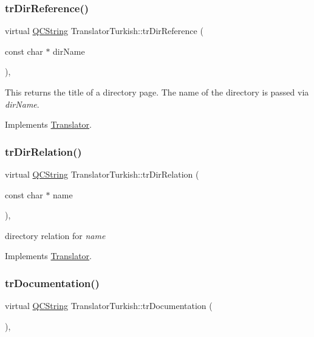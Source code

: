 \subsubsection{\texorpdfstring{trDirReference()}{trDirReference()}}
{\footnotesize\ttfamily virtual \mbox{\hyperlink{class_q_c_string}{Q\+C\+String}} Translator\+Turkish\+::tr\+Dir\+Reference (\begin{DoxyParamCaption}\item[{const char $\ast$}]{dir\+Name }\end{DoxyParamCaption})\hspace{0.3cm}{\ttfamily [inline]}, {\ttfamily [virtual]}}

This returns the title of a directory page. The name of the directory is passed via {\itshape dir\+Name}. 

Implements \mbox{\hyperlink{class_translator}{Translator}}.

\mbox{\label{class_translator_turkish_aaf0dc4f3528c646b7cbe8e043898049a}} 
\subsubsection{\texorpdfstring{trDirRelation()}{trDirRelation()}}
{\footnotesize\ttfamily virtual \mbox{\hyperlink{class_q_c_string}{Q\+C\+String}} Translator\+Turkish\+::tr\+Dir\+Relation (\begin{DoxyParamCaption}\item[{const char $\ast$}]{name }\end{DoxyParamCaption})\hspace{0.3cm}{\ttfamily [inline]}, {\ttfamily [virtual]}}

directory relation for {\itshape name} 

Implements \mbox{\hyperlink{class_translator}{Translator}}.

\mbox{\label{class_translator_turkish_a02fe91d8a3264b095954d390c35cfa2f}} 
\subsubsection{\texorpdfstring{trDocumentation()}{trDocumentation()}}
{\footnotesize\ttfamily virtual \mbox{\hyperlink{class_q_c_string}{Q\+C\+String}} Translator\+Turkish\+::tr\+Documentation (\begin{DoxyParamCaption}{ }\end{DoxyParamCaption})\hspace{0.3cm}{\ttfamily [inline]}, {\ttfamily [virtual]}}

